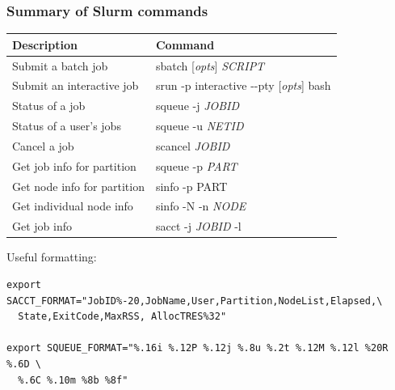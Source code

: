 \documentclass[10pt]{beamer}
\newcommand\smallfont{\fontsize{8pt}{7.2}\selectfont}
\begin{document}
\begin{frame}[fragile]
\frametitle{Summary of Slurm commands}
\begin{tabular}{|l|l|}
\hline
\textbf{Description} & \textbf{Command} \\
\hline
Submit a batch job & sbatch [\textit{opts}] \textit{SCRIPT} \\
\hline
Submit an interactive job & srun -p interactive -{}-pty [\textit{opts}] bash  \\
\hline
Status of a job & squeue -j \textit{JOBID} \\
\hline
Status of a user's jobs & squeue -u \textit{NETID} \\
\hline
Cancel a job & scancel \textit{JOBID} \\
\hline
Get job info for partition & squeue -p \textit{PART} \\
\hline
Get node info for partition & sinfo -p {PART} \\
\hline
Get individual node info & sinfo -N -n \textit{NODE} \\
\hline
Get job info & sacct -j \textit{JOBID} -l \\
\hline
\end{tabular}

\vspace{0.1in}
Useful formatting:
\smallfont
\begin{verbatim}
export SACCT_FORMAT="JobID%-20,JobName,User,Partition,NodeList,Elapsed,\
  State,ExitCode,MaxRSS, AllocTRES%32"

export SQUEUE_FORMAT="%.16i %.12P %.12j %.8u %.2t %.12M %.12l %20R %.6D \
  %.6C %.10m %8b %8f"
\end{verbatim}

\end{frame}
\end{document}
